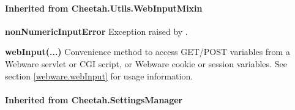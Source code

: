 %

\paragraph*{Inherited from Cheetah.Utils.WebInputMixin}

\begin{description}
\item{{\bf nonNumericInputError}}  Exception raised by .
\item{{\bf * webInput(...)}}  Convenience method to access GET/POST variables
    from a Webware servlet or CGI script, or Webware cookie or session
    variables.  See section \ref{webware.webInput} for usage information.
\end{description}

\paragraph*{Inherited from Cheetah.SettingsManager}


